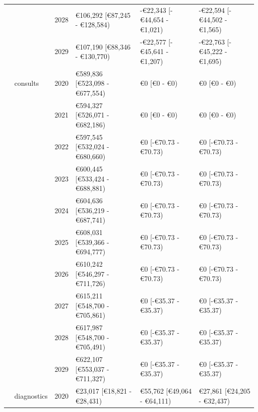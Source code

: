 \documentclass[
]{article}
\begin{document}
\begin{landscape}
\begin{longtable}[t]{llrlll}
\cmidrule{3-6}\nopagebreak
\hspace{1em} &  & 2028 & €106,292 [€87,245 - €128,584) & -€22,343 [-€44,654 - €1,021) & -€22,594 [-€44,502 - €1,565)\\
\cmidrule{3-6}\nopagebreak
\hspace{1em} &  & 2029 & €107,190 [€88,346 - €130,770) & -€22,577 [-€45,641 - €1,207) & -€22,763 [-€45,222 - €1,695)\\
\cmidrule{2-6}\nopagebreak
\hspace{1em} & consults & 2020 & €589,836 [€523,098 - €677,554) & €0 [€0 - €0) & €0 [€0 - €0)\\
\cmidrule{3-6}\nopagebreak
\hspace{1em} &  & 2021 & €594,327 [€526,071 - €682,186) & €0 [€0 - €0) & €0 [€0 - €0)\\
\cmidrule{3-6}\nopagebreak
\hspace{1em} &  & 2022 & €597,545 [€532,024 - €680,660) & €0 [-€70.73 - €70.73) & €0 [-€70.73 - €70.73)\\
\cmidrule{3-6}\nopagebreak
\hspace{1em} &  & 2023 & €600,445 [€533,424 - €688,881) & €0 [-€70.73 - €70.73) & €0 [-€70.73 - €70.73)\\
\cmidrule{3-6}\nopagebreak
\hspace{1em} &  & 2024 & €604,636 [€536,219 - €687,741) & €0 [-€70.73 - €70.73) & €0 [-€70.73 - €70.73)\\
\cmidrule{3-6}\nopagebreak
\hspace{1em} &  & 2025 & €608,031 [€539,366 - €694,777) & €0 [-€70.73 - €70.73) & €0 [-€70.73 - €70.73)\\
\cmidrule{3-6}\nopagebreak
\hspace{1em} &  & 2026 & €610,242 [€546,297 - €711,726) & €0 [-€70.73 - €70.73) & €0 [-€70.73 - €70.73)\\
\cmidrule{3-6}\nopagebreak
\hspace{1em} &  & 2027 & €615,211 [€548,700 - €705,861) & €0 [-€35.37 - €35.37) & €0 [-€35.37 - €35.37)\\
\cmidrule{3-6}\nopagebreak
\hspace{1em} &  & 2028 & €617,987 [€548,700 - €705,491) & €0 [-€35.37 - €35.37) & €0 [-€35.37 - €35.37)\\
\cmidrule{3-6}\nopagebreak
\hspace{1em} &  & 2029 & €622,107 [€553,037 - €711,327) & €0 [-€35.37 - €35.37) & €0 [-€35.37 - €35.37)\\
\cmidrule{2-6}\nopagebreak
\hspace{1em} & diagnostics & 2020 & €23,017 [€18,821 - €28,431) & €55,762 [€49,064 - €64,111) & €27,861 [€24,205 - €32,437)\\

\end{longtable}
\end{landscape}
\end{document}
